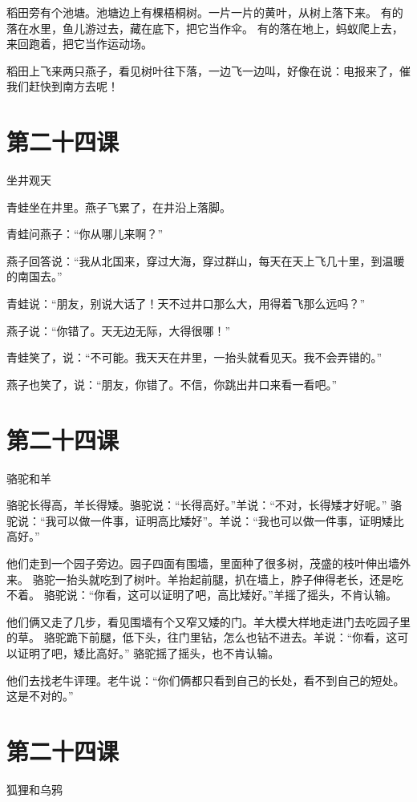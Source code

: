 \documentclass[12pt,UTF8]{ctexbook}
\begin{document}
稻田旁有个池塘。池塘边上有棵梧桐树。一片一片的黄叶，从树上落下来。
有的落在水里，鱼儿游过去，藏在底下，把它当作伞。
有的落在地上，蚂蚁爬上去，来回跑着，把它当作运动场。

稻田上飞来两只燕子，看见树叶往下落，一边飞一边叫，好像在说：电报来了，催我们赶快到南方去呢！

\section{第二十四课}

坐井观天

青蛙坐在井里。燕子飞累了，在井沿上落脚。

青蛙问燕子：“你从哪儿来啊？”

燕子回答说：“我从北国来，穿过大海，穿过群山，每天在天上飞几十里，到温暖的南国去。”

青蛙说：“朋友，别说大话了！天不过井口那么大，用得着飞那么远吗？”

燕子说：“你错了。天无边无际，大得很哪！”

青蛙笑了，说：“不可能。我天天在井里，一抬头就看见天。我不会弄错的。”

燕子也笑了，说：“朋友，你错了。不信，你跳出井口来看一看吧。”

\section{第二十四课}

骆驼和羊

骆驼长得高，羊长得矮。骆驼说：“长得高好。”羊说：“不对，长得矮才好呢。”
骆驼说：“我可以做一件事，证明高比矮好”。羊说：“我也可以做一件事，证明矮比高好。”

他们走到一个园子旁边。园子四面有围墙，里面种了很多树，茂盛的枝叶伸出墙外来。
骆驼一抬头就吃到了树叶。羊抬起前腿，扒在墙上，脖子伸得老长，还是吃不着。
骆驼说：“你看，这可以证明了吧，高比矮好。”羊摇了摇头，不肯认输。

他们俩又走了几步，看见围墙有个又窄又矮的门。羊大模大样地走进门去吃园子里的草。
骆驼跪下前腿，低下头，往门里钻，怎么也钻不进去。羊说：“你看，这可以证明了吧，矮比高好。”
骆驼摇了摇头，也不肯认输。

他们去找老牛评理。老牛说：“你们俩都只看到自己的长处，看不到自己的短处。这是不对的。”

\section{第二十四课}

狐狸和乌鸦
\end{document}
